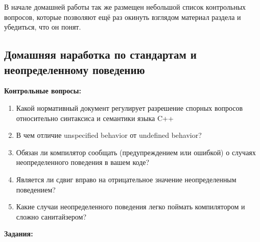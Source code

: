 \documentclass[a4paper,12pt,oneside]{article}
\begin{document}
В начале домашней работы так же размещен небольшой список контрольных вопросов, которые позволяют ещё раз окинуть взглядом материал раздела и убедиться, что он понят.

\pagebreak
\subsection{Домашняя наработка по стандартам и неопределенному поведению}\label{StandHomework}

\textbf{Контрольные вопросы:} 

\begin{enumerate}
\item Какой нормативный документ регулирует разрешение спорных вопросов относительно синтаксиса и семантики языка C++
\item В чем отличие unspecified behavior от undefined behavior?
\item Обязан ли компилятор сообщать (предупреждением или ошибкой) о случаях неопределенного поведения в вашем коде?
\item Является ли сдвиг вправо на отрицательное значение неопределенным поведением?
\item Какие случаи неопределенного поведения легко поймать компилятором и сложно санитайзером? 
\end{enumerate}

\textbf{Задания:} 
\end{document}
